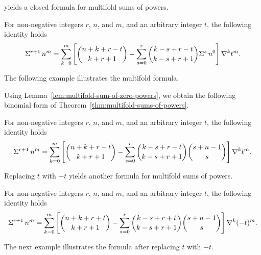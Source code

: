 yields a closed formula for multifold sums of powers.
\begin{theorem} 
  \label{thm:multifold-sums-of-powers}
  For non-negative integers $r$, $n$, and $m$, and an arbitrary integer $t$, the following identity holds
  \begin{align*}
    \Sigma^{r+1}\,{n}^{m}
    =
    \sum_{k=0}^{m}
    \left[
      \binom{n+k+r-t}{k+r+1}
      -
      \sum_{s=0}^{r}
      \binom{k-s+r-t}{k-s+r+1} \Sigma^{s}\,{n}^{0}
    \right] \nabla^{k} t^{m}.
  \end{align*}
\end{theorem}
The following example illustrates the multifold formula.

Using Lemma~\eqref{lem:multifold-sum-of-zero-powers},
we obtain the following binomial form of Theorem~\eqref{thm:multifold-sums-of-powers}.
\begin{proposition} 
  \label{prop:multifold-binomial-sums-of-powers}
  For non-negative integers $r$, $n$, and $m$, and an arbitrary integer $t$, the following identity holds
  \begin{align*}
    \Sigma^{r+1}\,{n}^{m}
    =
    \sum_{k=0}^{m}
    \left[
      \binom{n+k+r-t}{k+r+1}
      -
      \sum_{s=0}^{r}
      \binom{k-s+r-t}{k-s+r+1} \binom{s+n-1}{s}
    \right] \nabla^{k} t^{m}.
  \end{align*}
\end{proposition}
Replacing $t$ with $-t$ yields another formula for multifold sums of powers.
\begin{proposition} 
  \label{prop:multifold-binomial-sums-of-powers-negated}
  For non-negative integers $r$, $n$, and $m$, and an arbitrary integer $t$, the following identity holds
  \begin{align*}
    \Sigma^{r+1}\,{n}^{m}
    =
    \sum_{k=0}^{m}
    \left[
      \binom{n+k+r+t}{k+r+1}
      -
      \sum_{s=0}^{r}
      \binom{k-s+r+t}{k-s+r+1} \binom{s+n-1}{s}
    \right] \nabla^{k} (-t)^{m}.
  \end{align*}
\end{proposition}
The next example illustrates the formula after replacing $t$ with $-t$.

